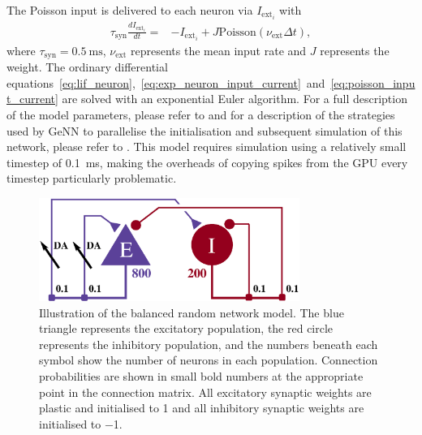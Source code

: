 \documentclass[utf8]{frontiersSCNS} %
\begin{document}
The Poisson input is delivered to each neuron via $I_{\text{ext}_{i}}$ with
%
\begin{align}
    \tau_{\text{syn}} \frac{dI_{\text{ext}_{i}}}{dt} = & -I_{\text{ext}_{i}} + J \text{Poisson}(\nu_{\text{ext}} \Delta t),\label{eq:poisson_input_current}
\end{align}
%
where $\tau_{\text{syn}}=\SI{0.5}{\milli\second}$, $\nu_{\text{ext}}$ represents the mean input rate and $J$ represents the weight.
The ordinary differential equations~\ref{eq:lif_neuron},~\ref{eq:exp_neuron_input_current}~and~\ref{eq:poisson_input_current} are solved with an exponential Euler algorithm.
For a full description of the model parameters, please refer to \citet[tables 4 and 5]{Potjans2012} and for a description of the strategies used by GeNN to parallelise the initialisation and subsequent simulation of this network, please refer to \citet[section 2.3]{Knight2018}.
This model requires simulation using a relatively small timestep of \SI{0.1}{\milli\second}, making the overheads of copying spikes from the GPU every timestep particularly problematic.
%
\begin{figure}[t!]
    \begin{center}
        \includegraphics[width=85mm]{figures/circuit2}
    \end{center}
    \caption{Illustration of the balanced random network model.
    The blue triangle represents the excitatory population, the red circle represents the inhibitory population, and the numbers beneath each symbol show the number of neurons in each population.
    Connection probabilities are shown in small bold numbers at the appropriate point in the connection matrix.
    All excitatory synaptic weights are plastic and initialised to \num{1} and all inhibitory synaptic weights are initialised to \num{-1}.}
    \label{fig:potjans_circuit}
\end{figure}
%
\end{document}

